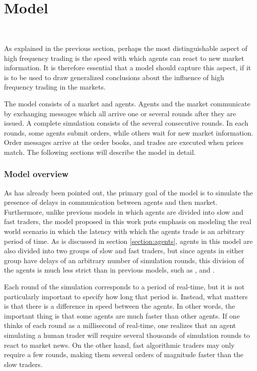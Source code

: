 \newpage
\part{Model} %

\label{chapter:model} %
$\frac{}{}$
	


As explained in the previous section, perhaps the most distinguishable aspect of high frequency trading is the speed with which agents can react to new market information. It is therefore essential that a model should capture this aspect, if it is to be used to draw generalized conclusions about the influence of high frequency trading in the markets.

The model consists of a market and agents. Agents and the market communicate by exchanging messages which all arrive one or several rounds after they are issued. A complete simulation consists of the several consecutive rounds. In each rounds, some agents submit orders, while others wait for new market information. Order messages arrive at the order books, and trades are executed when prices match.  The following sections will describe the model in detail.



\section{Model overview}

As has already been pointed out, the primary goal of the model is to simulate the presence of delays in communication between agents and then market. Furthermore, unlike previous models in which agents are divided into slow and fast traders, the model proposed in this work puts emphasis on modeling the real world scenario in which the latency with which the agents trade is an arbitrary period of time. As is discussed in section \ref{section:agents}, agents in this model are also divided into two groups of slow and fast traders, but since agents in either group have delays of an arbitrary number of simulation rounds, this division of the agents is much less strict than in previous models, such as \cite{keylist}, \cite{} and \cite{}.

Each round of the simulation corresponds to a period of real-time, but it is not particularly important to specify how long that period is. Instead, what matters is that there is a difference in speed between the agents. In other words, the important thing is that some agents are much faster than other agents. If one thinks of each round as a millisecond of real-time, one realizes that an agent simulating a human trader will require several thousands of simulation rounds to react to market news. On the other hand, fast algorithmic traders may only require a few rounds, making them several orders of magnitude faster than the slow traders. 


